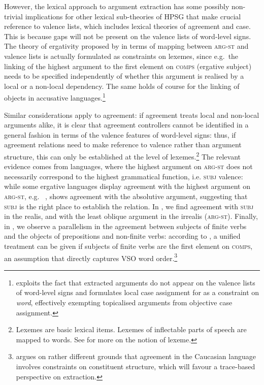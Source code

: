 \documentclass[output=paper,biblatex,babelshorthands,newtxmath,draftmode,colorlinks,citecolor=brown]{langscibook}
\begin{document}
However, the lexical approach to argument extraction has some possibly
non-trivial implications for other lexical sub-theories of HPSG that
make crucial reference to valence lists, which includes lexical
theories of agreement and case. This is because gaps will not be
present on the valence lists of word-level signs. The theory of
ergativity proposed by \citet[Section~5.2]{Manning:Sag:99} in terms of
mapping between \textsc{arg-st} and valence lists is actually
formulated as constraints on lexemes, since e.g.\ the linking of the
highest argument to the first element on \textsc{comps} (ergative
subject) needs to be specified independently of whether this argument
is realised by a local or a non-local dependency. The same holds of
course for the linking of objects in accusative
languages.\footnote{\citet{Crysmann:09} exploits the fact that
  extracted arguments do not appear on the valence lists of word-level
  signs and formulates local case assignment for  as a
  constraint on \textit{word}, effectively exempting topicalised
  arguments from objective case assignment.}

Similar considerations apply to agreement: if agreement treats local
and non-local arguments alike, it is clear that agreement controllers
cannot be identified in a general fashion in terms of the valence
features of word-level signs: thus, if agreement relations need to make
reference to valence rather than argument structure, this can only be
established at the level of lexemes.\footnote{
{Lexemes are basic lexical items. Lexemes of inflectable parts of speech are mapped to
  words. See  for
  more on the notion of lexeme.}
} The relevant evidence comes from
languages, where the highest argument on \textsc{arg-st} does not
necessarily correspond to the highest grammatical function, i.e.
\textsc{subj} valence: while some ergative languages display agreement
with the highest argument on \textsc{arg-st}, e.g.\ 
\citep{harris_a84udi},  \citep{kibrik94:_archi} shows agreement
with the absolutive argument, suggesting that \textsc{subj} is the
right place to establish the relation. %
In  \citep{Crysmann:09}, we find agreement with \textsc{subj} in the realis, and with
the least oblique argument in the irrealis (\textsc{arg-st}). Finally,
in , we observe a parallelism in the agreement between subjects
of finite verbs and the objects of prepositions and non-finite verbs:
according to \citet[Section~4]{Borsley89}, a unified treatment can be given if
subjects of finite verbs are the first element on \textsc{comps}, an
assumption that directly captures  VSO word order.\footnote{
  \citet[Section~5.4]{Borsley:16:Archi} argues on rather different grounds that
  agreement in the Caucasian language  involves constraints on
  constituent structure, which will favour a trace-based perspective on
  extraction. }
\end{document}

